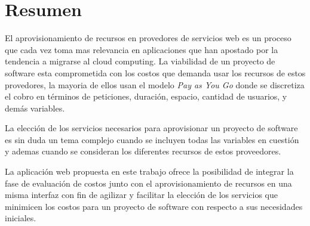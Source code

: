 



\begingroup
\let\clearpage\relax
\let\cleardoublepage\relax
\let\cleardoublepage\relax

\chapter*{Resumen}
El aprovisionamiento de recursos en provedores de servicios web es un proceso que cada vez toma mas relevancia en aplicaciones que han apostado por la tendencia a migrarse al cloud computing. La viabilidad de un proyecto de software esta comprometida con los costos que demanda usar los recursos de estos provedores, la mayoria de ellos usan el modelo \textit{Pay as You Go} donde se discretiza el cobro en términos de peticiones, duración, espacio, cantidad de usuarios, y demás variables. \bigskip

La elección de los servicios necesarios para aprovisionar un proyecto de software es sin duda un tema complejo cuando se incluyen todas las variables en cuestión y ademas cuando se consideran los diferentes recursos de estos proveedores.\bigskip

La aplicación web propuesta en este trabajo ofrece la posibilidad de integrar la fase de evaluación de costos junto con el aprovisionamiento de recursos en una misma interfaz con fin de agilizar y facilitar la elección de los servicios que minimicen los costos para un proyecto de software con respecto a sus necesidades iniciales.

\endgroup			

\vfill